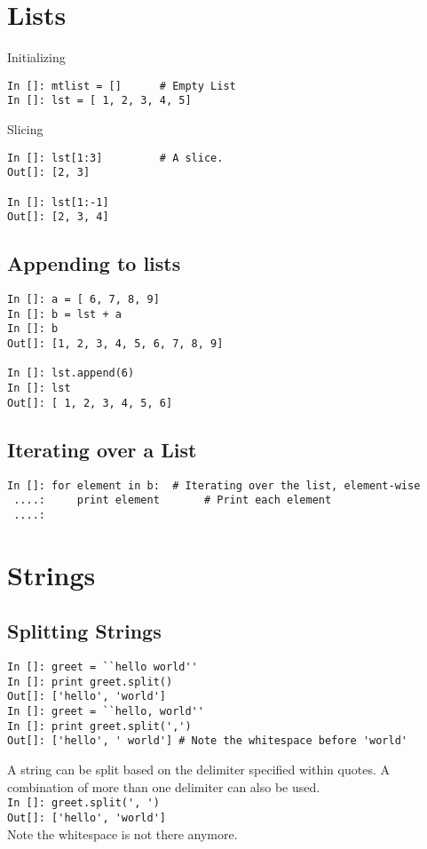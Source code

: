\documentclass[12pt]{article}
\newcommand{\typ}[1]{\lstinline{#1}}
\begin{document}
\section{Lists}

Initializing
  \begin{lstlisting}
In []: mtlist = []      # Empty List
In []: lst = [ 1, 2, 3, 4, 5] 
  \end{lstlisting}
Slicing
\begin{lstlisting}
In []: lst[1:3]         # A slice.
Out[]: [2, 3]

In []: lst[1:-1]
Out[]: [2, 3, 4]
\end{lstlisting}
\subsection{Appending to lists}
\begin{lstlisting}
In []: a = [ 6, 7, 8, 9]
In []: b = lst + a
In []: b
Out[]: [1, 2, 3, 4, 5, 6, 7, 8, 9]

In []: lst.append(6)
In []: lst
Out[]: [ 1, 2, 3, 4, 5, 6]
\end{lstlisting}
\subsection{Iterating over a List}
\begin{lstlisting}
In []: for element in b:  # Iterating over the list, element-wise
 ....:     print element       # Print each element
 ....:
\end{lstlisting}

\section{Strings}
\subsection{Splitting Strings}
\begin{lstlisting}
In []: greet = ``hello world''
In []: print greet.split()
Out[]: ['hello', 'world']
In []: greet = ``hello, world''
In []: print greet.split(',')
Out[]: ['hello', ' world'] # Note the whitespace before 'world'
\end{lstlisting}
A string can be split based on the delimiter specified within quotes. A combination of more than one delimiter can also be used.\\
\typ{In []: greet.split(', ')}\\
\typ{Out[]: ['hello', 'world']}\\Note the whitespace is not there anymore.
\newpage
\end{document}
